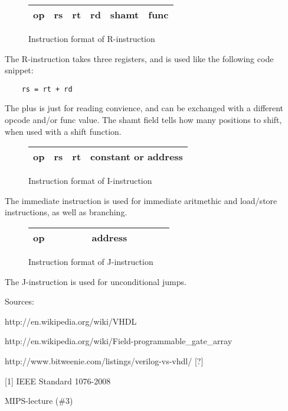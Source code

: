 \begin{figure}[ht]
    \centering
    \begin{tabular}{ | c | c | c | c | c | c | }
        \hline
        op & rs & rt & rd & shamt & func \\
        \hline
    \end{tabular}
    \caption{\label{fig:rInstruction}Instruction format of R-instruction}
\end{figure}

The R-instruction takes three registers, and is used like the following code
snippet:

\begin{verbatim}
    rs = rt + rd
\end{verbatim}

The plus is just for reading convience, and can be exchanged with a different
opcode and/or func value. The shamt field tells how many positions to shift,
when used with a shift function.

\begin{figure}[ht]
    \centering
    \begin{tabular}{ | c | c | c |  c  | }
        \hline
        op & rs & rt & constant or address   \\
        \hline
    \end{tabular}
    \caption{\label{fig:iInstruction}Instruction format of I-instruction}
\end{figure}

The immediate instruction is used for immediate aritmethic and load/store
instructions, as well as branching. 


\begin{figure}[ht]
    \centering
    \begin{tabular}{ | c | c c c c c c c c c | }
        \hline
        op & & & & & address & & & &  \\
        \hline
    \end{tabular}
    \caption{\label{fig:jInstruction}Instruction format of J-instruction}
\end{figure}

The J-instruction is used for unconditional jumps.


Sources:

http://en.wikipedia.org/wiki/VHDL

http://en.wikipedia.org/wiki/Field-programmable_gate_array

http://www.bitweenie.com/listings/verilog-vs-vhdl/ [?]

[1] IEEE Standard 1076-2008

MIPS-lecture (\#3)
